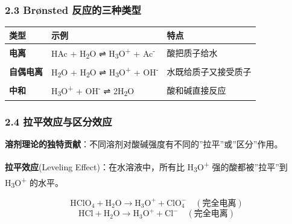 \subsubsection{2.3 Brønsted 反应的三种类型}\label{bruxf8nsted-ux53cdux5e94ux7684ux4e09ux79cdux7c7bux578b}

{\def\LTcaptype{none} %
\begin{longtable}[]{@{}
  >{\raggedright\arraybackslash}p{}
  >{\raggedright\arraybackslash}p{}
  >{\raggedright\arraybackslash}p{}@{}}
\toprule\noalign{}
\begin{minipage}[b]{\linewidth}\raggedright
类型
\end{minipage} & \begin{minipage}[b]{\linewidth}\raggedright
示例
\end{minipage} & \begin{minipage}[b]{\linewidth}\raggedright
特点
\end{minipage} \\
\midrule\noalign{}
\endhead
\bottomrule\noalign{}
\endlastfoot
\textbf{电离} & HAc + H\textsubscript{2}O ⇌ H\textsubscript{3}O\textsuperscript{+} + Ac\textsuperscript{-} & 酸把质子给水 \\
\textbf{自偶电离} & H\textsubscript{2}O + H\textsubscript{2}O ⇌ H\textsubscript{3}O\textsuperscript{+} + OH\textsuperscript{-} & 水既给质子又接受质子 \\
\textbf{中和} & H\textsubscript{3}O\textsuperscript{+} + OH\textsuperscript{-} ⇌ 2H\textsubscript{2}O & 酸和碱直接反应 \\
\end{longtable}
}

\subsubsection{2.4 拉平效应与区分效应}\label{ux62c9ux5e73ux6548ux5e94ux4e0eux533aux5206ux6548ux5e94}

\textbf{溶剂理论的独特贡献}：不同溶剂对酸碱强度有不同的''拉平''或''区分''作用。

\textbf{拉平效应}(Leveling Effect)：在水溶液中，所有比 H\textsubscript{3}O\textsuperscript{+} 强的酸都被''拉平''到 H\textsubscript{3}O\textsuperscript{+} 的水平。

\[
\mathrm{HClO_4 + H_2O \to H_3O^+ + ClO_4^-} \quad (\text{完全电离})
\]
\[
\mathrm{HCl + H_2O \to H_3O^+ + Cl^-} \quad (\text{完全电离})
\]

